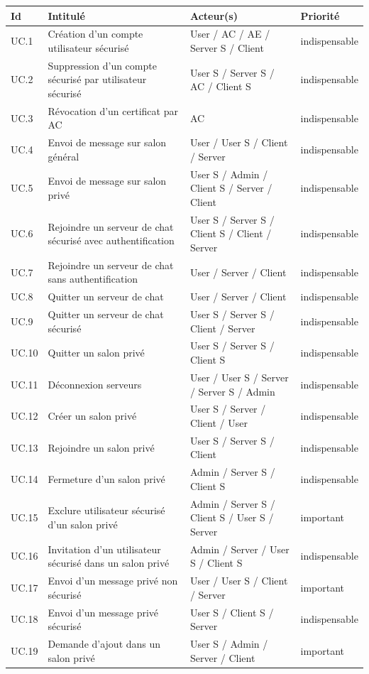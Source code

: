 \documentclass[a4paper,11pt,french]{article}
\begin{document}
\begin{center}
\begin{tabular}{|l|p{6cm}|p{6cm}|l|}
\hline
\bfseries{Id} & \bfseries{Intitulé} & \bfseries{Acteur(s)} & \bfseries{Priorité}\\
\hline
UC.1 & Création d'un compte utilisateur sécurisé & User / AC / AE / Server S / Client & indispensable\\
\hline
UC.2 & Suppression d'un compte sécurisé par utilisateur sécurisé & User S / Server S / AC / Client S& indispensable\\
\hline
UC.3 & Révocation d'un certificat par AC & AC& indispensable\\
\hline
UC.4 & Envoi de message sur salon général & User / User S / Client / Server& indispensable\\
\hline
UC.5 & Envoi de message sur salon privé & User S / Admin / Client S / Server / Client& indispensable\\
\hline
UC.6 & Rejoindre un serveur de chat sécurisé avec authentification & User S / Server S / Client S / Client / Server& indispensable\\
\hline
UC.7 & Rejoindre un serveur de chat sans authentification & User / Server / Client& indispensable\\
\hline
UC.8 & Quitter un serveur de chat & User / Server / Client& indispensable\\
\hline
UC.9 & Quitter un serveur de chat sécurisé & User S / Server S / Client / Server& indispensable\\
\hline
UC.10 & Quitter un salon privé & User S / Server S / Client S& indispensable\\
\hline
UC.11 & Déconnexion serveurs & User / User S / Server / Server S / Admin& indispensable\\
\hline
UC.12 & Créer un salon privé & User S / Server / Client / User& indispensable\\
\hline
UC.13 & Rejoindre un salon privé & User S / Server S / Client& indispensable\\
\hline
UC.14 & Fermeture d'un salon privé & Admin / Server S / Client S& indispensable\\
\hline
UC.15 & Exclure utilisateur sécurisé d'un salon privé & Admin / Server S / Client S / User S / Server& important\\
\hline
UC.16 & Invitation d'un utilisateur sécurisé dans un salon privé & Admin / Server / User S / Client S& indispensable\\
\hline 
UC.17 & Envoi d'un message privé non sécurisé & User / User S / Client / Server& important\\
\hline
UC.18 & Envoi d'un message privé sécurisé & User S / Client S / Server& indispensable\\
\hline
UC.19 & Demande d'ajout dans un salon privé & User S / Admin / Server / Client& important\\
\hline
\end{tabular}
\end{center}
\end{document}
